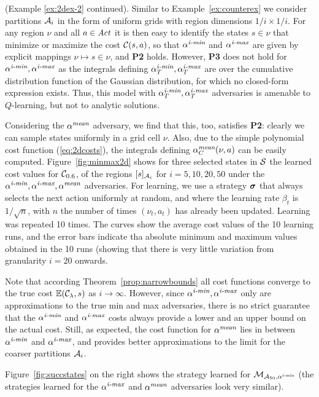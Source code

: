 \documentclass{llncs}
\begin{document}
\begin{example}
\label{ex:2dex-3}
(Example \ref{ex:2dex-2} continued). 
Similar to Example~\ref{ex:counterex} we consider partitions $\mathcal{A}_i$ in the form of uniform grids with
region dimensions $1/i \times 1/i$.
For any region $\nu$ and all $a\in\mathit{Act}$ it is then easy to identify the
states $s\in\nu$ that minimize or maximize the cost $\mathcal{C}(s,a)$, so that $\alpha^{\emph{i-min}}$ and $\alpha^{\emph{i-max}}$ are
given by explicit mappings $\nu\mapsto s\in\nu$, and  {\bf P2} holds. However, {\bf P3} does not hold for
$\alpha^{\emph{i-min}}, \alpha^{\emph{i-max}}$ as the integrals defining $\alpha^{\emph{i-min}}_T,\alpha^{\emph{i-max}}_T$ are over the cumulative
distribution function of the Gaussian distribution, for which no closed-form expression exists.
Thus, this model with  $\alpha^{\emph{i-min}}_T,\alpha^{\emph{i-max}}_T$ adversaries is amenable to $Q$-learning, but not
to analytic solutions. 

Considering the $\alpha^{\emph{mean}}$ adversary, we find that this, too, satisfies {\bf P2}: clearly we can sample
states uniformly in a grid cell $\nu$. Also, due to the simple polynomial cost function (\ref{eq:2dcosts}), the
integrals defining $\alpha^{\emph{mean}}_C(\nu,a)$ can be easily computed. 
Figure~\ref{fig:minmax2d} shows for three selected states in $\mathcal{S}$ the learned cost values
for $\mathcal{C}_{0.6}$, of the regions
$[s]_{\mathcal{A}_i}$ for $i=5,10,20,50$ under the $\alpha^{\emph{i-min}}, \alpha^{\emph{i-max}}, \alpha^{\emph{mean}}$ adversaries.
For learning, we use a strategy $\boldsymbol{\sigma}$ that always selects the next action uniformly at random, and
where the learning rate $\beta_t$ is $1/\sqrt{n}$, with $n$ the number of times $(\nu_t,a_t)$ has already
been updated. Learning was repeated 10 times. The curves show the average cost values of the 10 learning
runs, and the error bars indicate tha absolute minimum and maximum values obtained in the 10 runs (showing
that there is very little variation from granularity $i=20$ onwards.

Note that
according Theorem~\ref{prop:narrowbounds} all  cost functions converge to
the true cost $\mathbb{E}(\mathcal{C}_{\lambda},s)$ as $i\rightarrow\infty$.
However, since $\alpha^{\emph{i-min}}, \alpha^{\emph{i-max}}$ only are approximations to the true min and max
adversaries, there is no strict guarantee that the $\alpha^{\emph{i-min}}$ and $\alpha^{\emph{i-max}}$ costs always provide
a lower and an upper bound on the actual cost. Still, as expected, the cost function for
$\alpha^{\emph{mean}}$ lies in between $\alpha^{\emph{i-min}}$ and $\alpha^{\emph{i-max}}$, and provides better approximations to the
limit for the coarser partitions $\mathcal{A}_i$. 

Figure~\ref{fig:succstates} on the right shows the strategy learned for $\mathcal{M}_{\mathcal{A}_{50},\alpha^{\emph{i-min}}}$
(the strategies learned for the $\alpha^{\emph{i-max}}$ and $\alpha^{\emph{mean}}$ adversaries look very similar).
\end{example}
\end{document}
